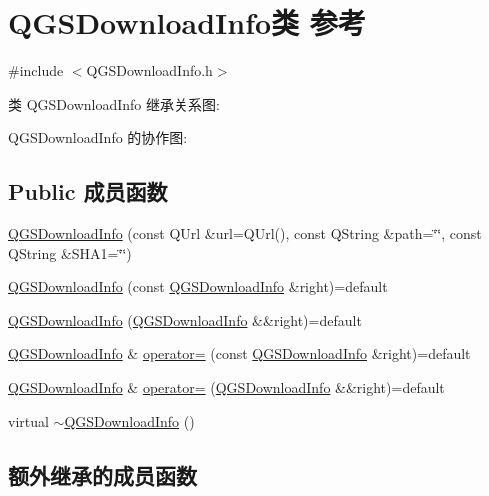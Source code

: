 \hypertarget{class_q_g_s_download_info}{}\section{Q\+G\+S\+Download\+Info类 参考}
\label{class_q_g_s_download_info}


{\ttfamily \#include $<$Q\+G\+S\+Download\+Info.\+h$>$}



类 Q\+G\+S\+Download\+Info 继承关系图\+:


Q\+G\+S\+Download\+Info 的协作图\+:
\subsection*{Public 成员函数}
\begin{DoxyCompactItemize}
\item 
\mbox{\hyperlink{class_q_g_s_download_info_aa032b1d5195a7d52c89b3ad672aa572f}{Q\+G\+S\+Download\+Info}} (const Q\+Url \&url=Q\+Url(), const Q\+String \&path=\char`\"{}\char`\"{}, const Q\+String \&S\+H\+A1=\char`\"{}\char`\"{})
\item 
\mbox{\hyperlink{class_q_g_s_download_info_ad1d783ef06e623c360e5c92f351a0caf}{Q\+G\+S\+Download\+Info}} (const \mbox{\hyperlink{class_q_g_s_download_info}{Q\+G\+S\+Download\+Info}} \&right)=default
\item 
\mbox{\hyperlink{class_q_g_s_download_info_afee7afed4d658fec57f6672bc078945f}{Q\+G\+S\+Download\+Info}} (\mbox{\hyperlink{class_q_g_s_download_info}{Q\+G\+S\+Download\+Info}} \&\&right)=default
\item 
\mbox{\hyperlink{class_q_g_s_download_info}{Q\+G\+S\+Download\+Info}} \& \mbox{\hyperlink{class_q_g_s_download_info_a8f7ae80774603f7c0b52de184b82eb63}{operator=}} (const \mbox{\hyperlink{class_q_g_s_download_info}{Q\+G\+S\+Download\+Info}} \&right)=default
\item 
\mbox{\hyperlink{class_q_g_s_download_info}{Q\+G\+S\+Download\+Info}} \& \mbox{\hyperlink{class_q_g_s_download_info_a8440aa99b02668e7895bf0d37ef66124}{operator=}} (\mbox{\hyperlink{class_q_g_s_download_info}{Q\+G\+S\+Download\+Info}} \&\&right)=default
\item 
virtual \mbox{\hyperlink{class_q_g_s_download_info_a9fba36dfd321fe980a8fd57eadf5dea1}{$\sim$\+Q\+G\+S\+Download\+Info}} ()
\end{DoxyCompactItemize}
\subsection*{额外继承的成员函数}


